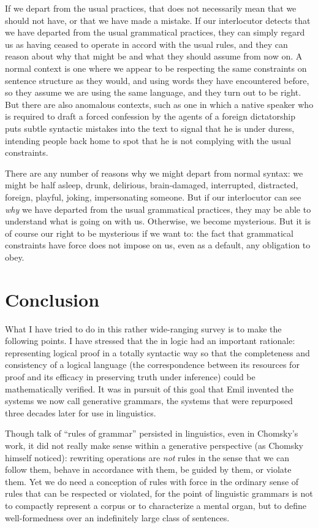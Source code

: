\documentclass[output=paper]{langscibook}
\begin{document}
If we depart from the usual practices, that does not necessarily mean that we should not have, or that we have made a mistake.  If our interlocutor detects that we have departed from the usual grammatical practices, they can simply regard us as having ceased to operate in accord with the usual rules, and they can reason about why that might be and what they should assume from now on. A normal context is one where we appear to be respecting the same constraints on sentence structure as they would, and using words they have encountered before, so they assume we are using the same language, and they turn out to be right. But there are also anomalous contexts, such as one in which a native speaker who is required to draft a forced confession by the agents of a foreign dictatorship puts subtle syntactic mistakes into the text to signal that he is under duress, intending people back home to spot that he is not complying with the usual constraints.

There are any number of reasons why we might depart from normal syntax: we might be half asleep, drunk, delirious, brain-damaged, interrupted, distracted, foreign, playful, joking, impersonating someone. But if our interlocutor can see \emph{why} we have departed from the usual grammatical practices, they may be able to understand what is going on with us. Otherwise, we become mysterious. But it is of course our right to be mysterious if we want to: the fact that grammatical constraints have  force does not impose on us, even as a default, any obligation to obey.

\section{Conclusion}
\label{sec:pullum:conc}

What I have tried to do in this rather wide-ranging survey is to make the following points. I have stressed that the  in logic had an important rationale: representing logical proof in a totally syntactic way so that the completeness and consistency of a logical language (the correspondence between its resources for proof and its efficacy in preserving truth under inference) could be mathematically verified.  It was in pursuit of this goal that Emil {\Post} invented the systems we now call generative grammars, the systems that were repurposed three decades later for use in linguistics.

Though talk of ``rules of grammar'' persisted in linguistics, even in Chomsky's work, it did not really make sense within a generative perspective (as Chomsky himself noticed): rewriting operations are \emph{not} rules in the sense that we can follow them, behave in accordance with them, be guided by them, or violate them.  Yet we do need a conception of rules with  force in the ordinary sense of rules that can be respected or violated, for the point of linguistic grammars is not to compactly represent a corpus or to characterize a mental organ, but to define well-formedness over an indefinitely large class of sentences.
\end{document}
